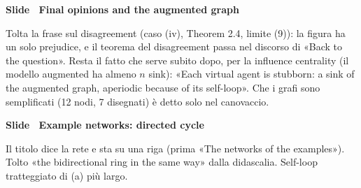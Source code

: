 \par\addvspace{14pt}\noindent\begin{minipage}{\textwidth}
{\color{unipd}\bfseries Slide  \textperiodcentered\ Final opinions and the augmented graph}\par\smallskip
{\small Tolta la frase sul disagreement (caso (iv), Theorem 2.4, limite (9)): la figura ha un solo prejudice, e il teorema del disagreement passa nel discorso di «Back to the question». Resta il fatto che serve subito dopo, per la influence centrality (il modello augmented ha almeno $n$ sink): «Each virtual agent is stubborn: a sink of the augmented graph, aperiodic because of its self-loop». Che i grafi sono semplificati (12 nodi, 7 disegnati) è detto solo nel canovaccio.}\par\smallskip
\noindent\begin{minipage}[t]{0.36\textwidth}\par
{}\par\smallskip
\end{minipage}\hfill\begin{minipage}[t]{0.61\textwidth}\par
{}\par\smallskip
\end{minipage}\par
\end{minipage}\par
\par\addvspace{14pt}\noindent\begin{minipage}{\textwidth}
{\color{unipd}\bfseries Slide  \textperiodcentered\ Example networks: directed cycle}\par\smallskip
{\small Il titolo dice la rete e sta su una riga (prima «The networks of the examples»). Tolto «the bidirectional ring in the same way» dalla didascalia. Self-loop tratteggiato di (a) più largo.}\par\smallskip
\noindent\begin{minipage}[t]{0.36\textwidth}\par
{}\par\smallskip
\end{minipage}\hfill\begin{minipage}[t]{0.61\textwidth}\par
{}\par\smallskip
\end{minipage}\par
\end{minipage}\par
